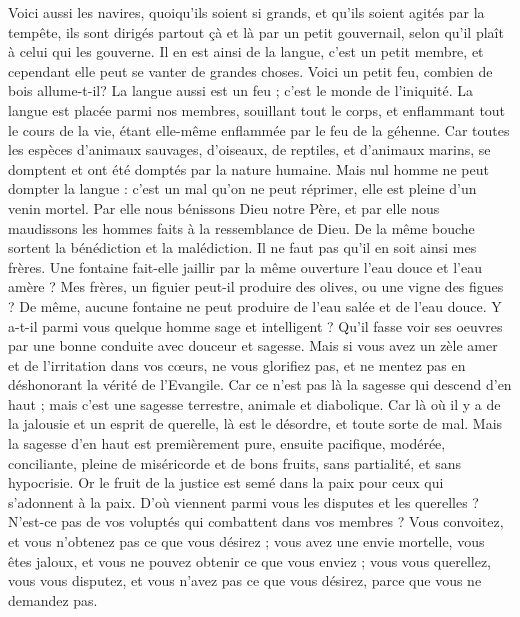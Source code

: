 \begin{multicols}{2}
Voici aussi les navires, quoiqu’ils soient si grands, et qu’ils soient agités par la tempête, ils sont dirigés partout çà et là par un petit gouvernail, selon qu’il plaît à celui qui les gouverne.
Il en est ainsi de la langue, c'est un petit membre, et cependant elle peut se vanter de grandes choses. Voici un petit feu, combien de bois allume-t-il?
La langue aussi est un feu ; c’est le monde de l’iniquité. La langue est placée parmi nos membres, souillant tout le corps, et enflammant tout le cours de la vie, étant elle-même enflammée par le feu de la géhenne.
Car toutes les espèces d’animaux sauvages, d'oiseaux, de reptiles, et d’animaux marins, se domptent et ont été domptés par la nature humaine.
Mais nul homme ne peut dompter la langue : c'est un mal qu’on ne peut réprimer, elle est pleine d'un venin mortel.
Par elle nous bénissons Dieu notre Père, et par elle nous maudissons les hommes faits à la ressemblance de Dieu.
De la même bouche sortent la bénédiction et la malédiction. Il ne faut pas qu’il en soit ainsi mes frères.
Une fontaine fait-elle jaillir par la même ouverture l’eau douce et l’eau amère ?
Mes frères, un figuier peut-il produire des olives, ou une vigne des figues ? De même, aucune fontaine ne peut produire de l'eau salée et de l'eau douce.
Y a-t-il parmi vous quelque homme sage et intelligent ? Qu’il fasse voir ses oeuvres par une bonne conduite avec douceur et sagesse.
Mais si vous avez un zèle amer et de l'irritation dans vos cœurs, ne vous glorifiez pas, et ne mentez pas en déshonorant la vérité de l'Evangile.
Car ce n’est pas là la sagesse qui descend d’en haut ; mais c’est une sagesse terrestre, animale et diabolique.
Car là où il y a de la jalousie et un esprit de querelle, là est le désordre, et toute sorte de mal.
Mais la sagesse d'en haut est premièrement pure, ensuite pacifique, modérée, conciliante, pleine de miséricorde et de bons fruits, sans partialité, et sans hypocrisie.
Or le fruit de la justice est semé dans la paix pour ceux qui s’adonnent à la paix.
\VerseOne{}D'où viennent parmi vous les disputes et les querelles ? N’est-ce pas de vos voluptés qui combattent dans vos membres ?
Vous convoitez, et vous n’obtenez pas ce que vous désirez ; vous avez une envie mortelle, vous êtes jaloux, et vous ne pouvez obtenir ce que vous enviez ; vous vous querellez, vous vous disputez, et vous n'avez pas ce que vous désirez, parce que vous ne demandez pas.

\end{multicols}
